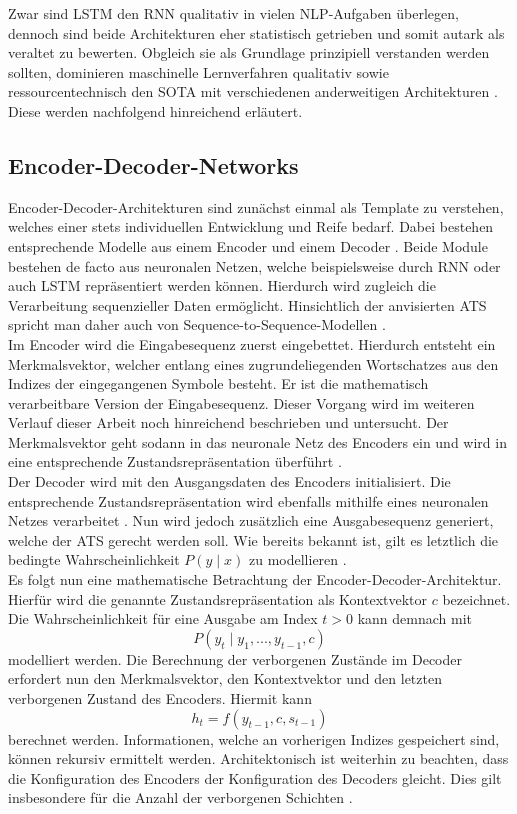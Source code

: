 \noindent
Zwar sind \ac{LSTM} den \ac{RNN} qualitativ in vielen \ac{NLP}-Aufgaben überlegen, dennoch sind beide Architekturen eher statistisch getrieben und somit autark als veraltet zu bewerten. Obgleich sie als Grundlage prinzipiell verstanden werden sollten, dominieren maschinelle Lernverfahren qualitativ sowie ressourcentechnisch den \ac{SOTA} mit verschiedenen anderweitigen Architekturen \cite{CUR18}. Diese werden nachfolgend hinreichend erläutert.


\subsection{Encoder-Decoder-Networks}
\noindent
Encoder-Decoder-Architekturen sind zunächst einmal als Template zu verstehen, welches einer stets individuellen Entwicklung und Reife bedarf. Dabei bestehen entsprechende Modelle aus einem Encoder und einem Decoder \cite[S.~375-376]{ZHA20}. Beide Module bestehen de facto aus neuronalen Netzen, welche beispielsweise durch \ac{RNN} oder auch \ac{LSTM} repräsentiert werden können. Hierdurch wird zugleich die Verarbeitung sequenzieller Daten ermöglicht. Hinsichtlich der anvisierten \ac{ATS} spricht man daher auch von Sequence-to-Sequence-Modellen \cite[S.~377]{ZHA20}.\\

\noindent
Im Encoder wird die Eingabesequenz zuerst eingebettet. Hierdurch entsteht ein Merkmalsvektor, welcher entlang eines zugrundeliegenden Wortschatzes aus den Indizes der eingegangenen Symbole besteht. Er ist die mathematisch verarbeitbare Version der Eingabesequenz. Dieser Vorgang wird im weiteren Verlauf dieser Arbeit noch hinreichend beschrieben und untersucht. Der Merkmalsvektor geht sodann in das neuronale Netz des Encoders ein und wird in eine entsprechende Zustandsrepräsentation überführt \cite{YAN19}.\\

\noindent
Der Decoder wird mit den Ausgangsdaten des Encoders initialisiert. Die entsprechende Zustandsrepräsentation wird ebenfalls mithilfe eines neuronalen Netzes verarbeitet \cite[S.379]{ZHA20}. Nun wird jedoch zusätzlich eine Ausgabesequenz generiert, welche der \ac{ATS} gerecht werden soll. Wie bereits bekannt ist, gilt es letztlich die bedingte Wahrscheinlichkeit $P(y \mid x)$ zu modellieren \cite{YAN19}.\\

\noindent
Es folgt nun eine mathematische Betrachtung der Encoder-Decoder-Architektur. Hierfür wird die genannte Zustandsrepräsentation als Kontextvektor $c$ bezeichnet. Die Wahrscheinlichkeit für eine Ausgabe am Index $t > 0$ kann demnach mit $$P(y_t \mid y_1, ..., y_{t-1}, c)$$ modelliert werden. Die Berechnung der verborgenen Zustände im Decoder erfordert nun den Merkmalsvektor, den Kontextvektor und den letzten verborgenen Zustand des Encoders. Hiermit kann $$h_t = f(y_{t-1}, c, s_{t-1})$$ berechnet werden. Informationen, welche an vorherigen Indizes gespeichert sind, können rekursiv ermittelt werden. Architektonisch ist weiterhin zu beachten, dass die Konfiguration des Encoders der Konfiguration des Decoders gleicht. Dies gilt insbesondere für die Anzahl der verborgenen Schichten \cite[S.~379]{ZHA20}.\\


